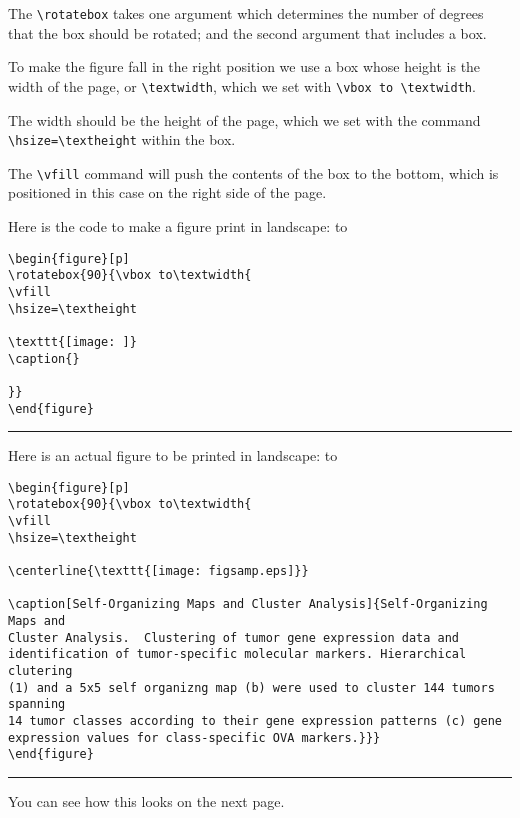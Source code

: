 \documentclass{kapproc} %
\def\code{\vskip3pt
\hbox to\textwidth{\vrule width \textwidth height .6pt}
\normalsize\vskip1sp}
\def\endcode{\vskip6pt}
\begin{document}
The \verb+\rotatebox+ takes one argument which determines the
number of degrees that the box should be rotated; and the
second argument that includes a box.

To make the figure fall in the right position we use a box
whose height is the width of the page, or \verb+\textwidth+,
which we set with \verb+\vbox to \textwidth+.

The width should be the height of the page, which we set with
the command \verb+\hsize=\textheight+ within the box.

The \verb+\vfill+ command will push the contents of the box
to the bottom, which is positioned in this case on the
right side of the page.

Here is the code to make a figure print in landscape:
\code
\begin{verbatim}
\begin{figure}[p]
\rotatebox{90}{\vbox to\textwidth{
\vfill
\hsize=\textheight

\texttt{[image: ]}
\caption{}

}}
\end{figure}
\end{verbatim}
\hrule
\endcode

Here is an actual figure to be printed in landscape:
\code
\begin{verbatim}
\begin{figure}[p]
\rotatebox{90}{\vbox to\textwidth{
\vfill
\hsize=\textheight

\centerline{\texttt{[image: figsamp.eps]}}

\caption[Self-Organizing Maps and Cluster Analysis]{Self-Organizing Maps and
Cluster Analysis.  Clustering of tumor gene expression data and
identification of tumor-specific molecular markers. Hierarchical clutering
(1) and a 5x5 self organizng map (b) were used to cluster 144 tumors spanning
14 tumor classes according to their gene expression patterns (c) gene
expression values for class-specific OVA markers.}}}
\end{figure}
\end{verbatim}
\hrule
\endcode

You can see how this looks on the next page.


\begin{figure}[p]
\end{figure}
\clearpage
\end{document}
